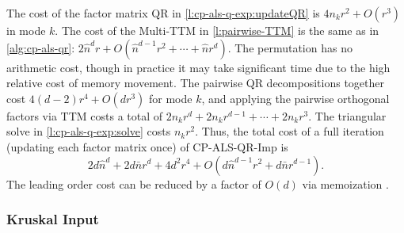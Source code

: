 \documentclass{article}
\begin{document}
The cost of the factor matrix QR in \cref{l:cp-als-q-exp:updateQR} is $4n_kr^2+O(r^3)$ in mode $k$.
The cost of the Multi-TTM in \cref{l:pairwise-TTM} is the same as in \cref{alg:cp-als-qr}: $2\hat{n}^dr+O(\hat{n}^{d-1}r^2 + \cdots + \hat{n}r^d)$.
The permutation has no arithmetic cost, though in practice it may take significant time due to the high relative cost of memory movement.
The pairwise QR decompositions together cost $4(d-2)r^4 + O(dr^3)$ for mode $k$, and applying the pairwise orthogonal factors via TTM costs a total of $2n_kr^d+2n_kr^{d-1}+\cdots+2n_kr^3$.
The triangular solve in \cref{l:cp-als-q-exp:solve} costs $n_kr^2$.
Thus, the total cost of a full iteration (updating each factor matrix once) of CP-ALS-QR-Imp is
$$ 2d\hat{n}^d + 2d\bar{n}r^d + 4d^2r^4 + O(d\hat{n}^{d-1}r^2 + d\bar{n}r^{d-1}). $$
The leading order cost can be reduced by a factor of $O(d)$ via memoization \cite{KR19}.

\subsubsection{Kruskal Input}
\end{document}
